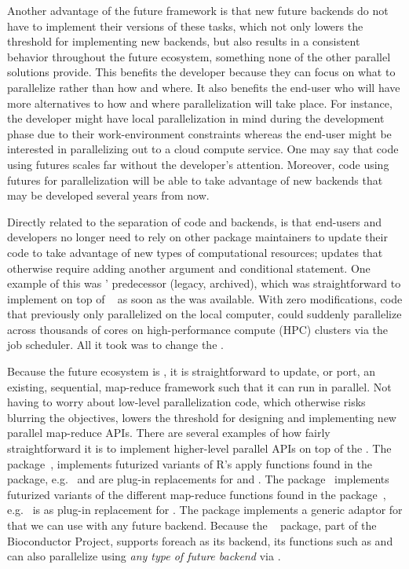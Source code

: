 Another advantage of the future framework is that new future backends
do not have to implement their versions of these tasks, which not only
lowers the threshold for implementing new backends, but also results
in a consistent behavior throughout the future ecosystem, something
none of the other parallel solutions provide.  This benefits the
developer because they can focus on what to parallelize rather than
how and where. It also benefits the end-user who will have more
alternatives to how and where parallelization will take place.  For
instance, the developer might have local parallelization in mind during
the development phase due to their work-environment constraints
whereas the end-user might be interested in parallelizing out to a
cloud compute service.  One may say that code using futures scales far
without the developer's attention.  Moreover, code using futures for
parallelization will be able to take advantage of new backends that
may be developed several years from now.

Directly related to the separation of code and backends, is that
end-users and developers no longer need to rely on other package
maintainers to update their code to take advantage of new types of
computational resources; updates that otherwise require adding another
argument and conditional statement.  One example of this
was ' predecessor
 (legacy, archived), which was straightforward to implement on top of
~\citep{Bischl_etal_2015} as soon as the 
was available.  With zero modifications, code that previously only
parallelized on the local computer, could suddenly parallelize across
thousands of cores on high-performance compute (HPC) clusters via the
job scheduler.  All it took was to change the .

Because the future ecosystem is , it is
straightforward to update, or port, an existing, sequential,
map-reduce framework such that it can run in parallel. Not having to
worry about low-level parallelization code, which otherwise risks
blurring the objectives, lowers the threshold for designing and
implementing new parallel map-reduce APIs.  There are several examples
of how fairly straightforward it is to implement higher-level parallel
APIs on top of the .  The 
package~\citep{CRAN:future.apply}, implements futurized variants of
R's apply functions found in the  package,
e.g.\  and  are plug-in
replacements for  and .  The 
package~\citep{CRAN:furrr} implements futurized variants of the
different map-reduce functions found in the 
package~\citep{CRAN:purrr}, e.g.\  is as plug-in
replacement for .  The  package implements a
generic  adaptor
for  that we can use
with any future backend.  Because
the ~\citep{Bioc:BiocParallel} package, part of
the Bioconductor Project, supports foreach as its backend, its
functions such as  and  can also
parallelize using \emph{any type of future backend} via
.

